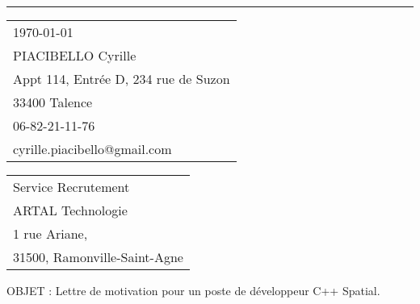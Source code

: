 \documentclass{article}
\begin{document}


\vspace{-1em} %

\rule{\linewidth}{1pt} %

\bigskip\bigskip %


\hfill
\begin{tabular}{l @{}}
	\today \bigskip\\ %
	PIACIBELLO Cyrille \\
	Appt 114, Entrée D,  234 rue de Suzon \\ %
	33400 Talence \\
	06-82-21-11-76 \\
	cyrille.piacibello@gmail.com
\end{tabular}

\bigskip %


\begin{tabular}{@{} l}
  Service Recrutement \\
  ARTAL Technologie \\
  1 rue Ariane,\\
  31500, Ramonville-Saint-Agne
\end{tabular}

\bigskip %

OBJET : Lettre de motivation pour un poste de développeur C++ Spatial.


\bigskip %

\end{document}
